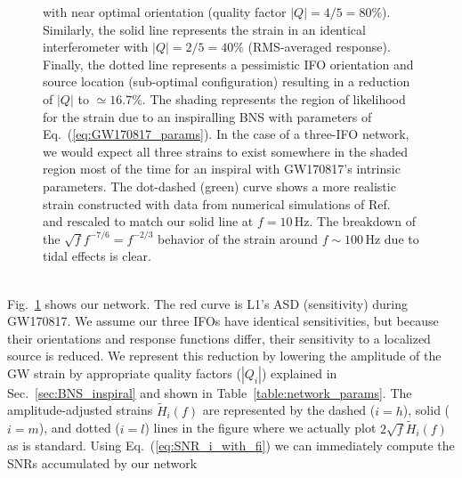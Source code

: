 \documentclass[prd,amsmath,amssymb,aps,floats,amsfonts,notitlepage,superscriptaddress,eqsecnum,nofootinbib,10pt]{revtex4-1}
\begin{document}
\begin{figure}[ht!]
{with near optimal orientation
(quality factor $|Q|=4/5=80\%$). Similarly, the solid line represents the strain in an identical interferometer with 
$|Q|=2/5=40\%$ (RMS-averaged response). %
Finally, the dotted line represents a pessimistic IFO orientation and source location (sub-optimal configuration)
resulting in a reduction of $|Q|$ to $\simeq 16.7\%$.
The shading represents the region of likelihood for the strain due to an inspiralling BNS with parameters of Eq.~(\ref{eq:GW170817_params}). In the case of a three-IFO
network, we would expect all three strains to exist somewhere in the shaded region most of the time for an inspiral with GW170817's intrinsic parameters. %
The dot-dashed (green) curve shows a more realistic strain constructed with data from numerical simulations of Ref.~\cite{Read:2009yp}
and rescaled to match our solid line at $f=10\,$Hz.
The breakdown of the $\sqrt{f}f^{-7/6}=f^{-2/3}$ behavior of
the strain around $f\sim100\,$Hz due to tidal effects is clear.
}
\label{fig:figGW170817}
\end{figure}\\
%
%
Fig.~\ref{fig:figGW170817} shows our network. The red curve is L1's ASD (sensitivity) during GW170817. We assume our three IFOs have identical sensitivities,
but because their orientations and response functions differ, their sensitivity to a localized source is reduced. We represent this reduction by lowering the
amplitude of the GW strain by appropriate quality factors ($|Q_i|$) explained in Sec.~\ref{sec:BNS_inspiral} and shown in Table~\ref{table:network_params}.
The amplitude-adjusted strains $ \tilde{H}_i(f)$ are represented by the dashed ($i=h$), solid ($i=m$), and dotted ($i=l$) lines in the figure where we actually plot
$2\sqrt{f} \tilde{H}_i(f)$ as is standard. 
Using Eq.~(\ref{eq:SNR_i_with_fi}) we can immediately compute the SNRs accumulated by our network
\end{document}
